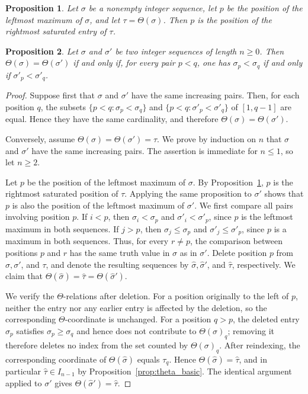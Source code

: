 \documentclass[10pt,a4paper]{amsart}
\newtheorem{prop}{Proposition}
\begin{document}
\begin{prop}\label{prop:image_leftmax_saturated}
Let $\sigma$ be a nonempty integer sequence, let $p$ be the position of the leftmost maximum of $\sigma$, and let $\tau=\Theta(\sigma)$. Then $p$ is the position of the rightmost saturated entry of $\tau$.
\end{prop}

\begin{prop}\label{prop:preimage_characterization}
Let $\sigma$ and $\sigma'$ be two integer sequences of length $n \geq 0$. Then $\Theta(\sigma)=\Theta(\sigma')$ if and only if,
for every pair $p<q$, one has $\sigma_p<\sigma_q$ if and only if
$\sigma'_p<\sigma'_q$.
\end{prop}

\begin{proof}
Suppose first that $\sigma$ and $\sigma'$ have the same increasing pairs. Then, for each position $q$, the subsets $\{p<q:\sigma_p<\sigma_q\}$ and $\{p<q:\sigma'_p<\sigma'_q\}$ of $[1,q-1]$ are equal. Hence they have the same cardinality, and therefore $\Theta(\sigma)=\Theta(\sigma')$.

Conversely, assume $\Theta(\sigma)=\Theta(\sigma')=\tau$. We prove by induction on $n$ that $\sigma$ and $\sigma'$ have the same increasing pairs. The assertion is immediate for $n\leq1$, so let $n\geq2$.

Let $p$ be the position of the leftmost maximum of $\sigma$. By
Proposition~\ref{prop:image_leftmax_saturated}, $p$ is the rightmost saturated
position of $\tau$. Applying the same proposition to $\sigma'$ shows that $p$ is
also the position of the leftmost maximum of $\sigma'$. We first compare all pairs involving position $p$. If $i<p$, then $\sigma_i<\sigma_p$ and $\sigma'_i<\sigma'_p$, since $p$ is the leftmost maximum in both sequences. If $j>p$, then $\sigma_j\leq\sigma_p$ and $\sigma'_j\leq\sigma'_p$, since $p$ is a maximum in both sequences. Thus, for every $r\neq p$, the comparison between positions $p$ and $r$ has the same truth value in $\sigma$ as in $\sigma'$. Delete position $p$ from $\sigma,\sigma'$, and $\tau$, and denote the resulting sequences by $\widehat{\sigma},\widehat{\sigma}'$, and $\widehat{\tau}$, respectively. We claim that $\Theta(\widehat{\sigma})=\widehat{\tau}=\Theta(\widehat{\sigma}')$.

We verify the $\Theta$-relations after deletion. For a position originally
to the left of $p$, neither the entry nor any earlier entry is affected by the
deletion, so the corresponding $\Theta$-coordinate is unchanged. For a position
$q>p$, the deleted entry $\sigma_p$ satisfies $\sigma_p\geq\sigma_q$ and hence
does not contribute to $\Theta(\sigma)_q$; removing it therefore deletes no index
from the set counted by $\Theta(\sigma)_q$. After reindexing, the corresponding
coordinate of $\Theta(\widehat{\sigma})$ equals $\tau_q$. Hence
$\Theta(\widehat{\sigma})=\widehat{\tau}$, and in particular
$\widehat{\tau}\in I_{n-1}$ by Proposition~\ref{prop:theta_basic}. The identical
argument applied to $\sigma'$ gives $\Theta(\widehat{\sigma}')=\widehat{\tau}$.


\end{proof}
\end{document}

